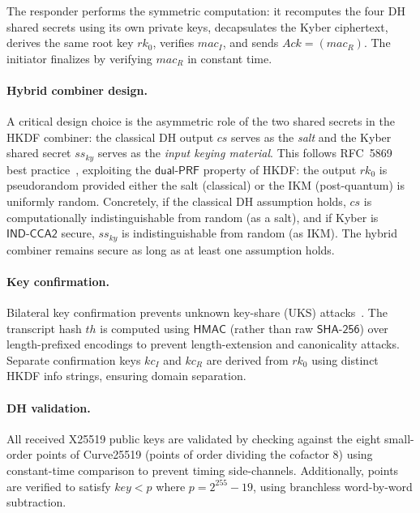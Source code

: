 \documentclass[11pt,a4paper]{article}
\theoremstyle{definition}
\newcommand{\HMAC}{\textsf{HMAC}}
\newcommand{\SHA}{\textsf{SHA-256}}
\newcommand{\INDCCA}{\textsf{IND-CCA2}}
\newcommand{\dualPRF}{\textsf{dual-PRF}}
\newcommand{\rk}{\mathit{rk}}
\begin{document}
The responder performs the symmetric computation: it recomputes the four DH shared secrets using its own private keys, decapsulates the Kyber ciphertext, derives the same root key $\rk_0$, verifies $\mathit{mac}_I$, and sends $\mathit{Ack} = (\mathit{mac}_R)$. The initiator finalizes by verifying $\mathit{mac}_R$ in constant time.

\paragraph{Hybrid combiner design.}
A critical design choice is the asymmetric role of the two shared secrets in the HKDF combiner: the classical DH output $\mathit{cs}$ serves as the \emph{salt} and the Kyber shared secret $\mathit{ss}_{\mathit{ky}}$ serves as the \emph{input keying material}. This follows RFC~5869 best practice~\cite{rfc5869}, exploiting the $\dualPRF$ property of HKDF: the output $\rk_0$ is pseudorandom provided either the salt (classical) or the IKM (post-quantum) is uniformly random. Concretely, if the classical DH assumption holds, $\mathit{cs}$ is computationally indistinguishable from random (as a salt), and if Kyber is $\INDCCA$ secure, $\mathit{ss}_{\mathit{ky}}$ is indistinguishable from random (as IKM). The hybrid combiner remains secure as long as at least one assumption holds.

\paragraph{Key confirmation.}
Bilateral key confirmation prevents unknown key-share (UKS) attacks~\cite{lamacchia2007}. The transcript hash $\mathit{th}$ is computed using $\HMAC$ (rather than raw $\SHA$) over length-prefixed encodings to prevent length-extension and canonicality attacks. Separate confirmation keys $\mathit{kc}_I$ and $\mathit{kc}_R$ are derived from $\rk_0$ using distinct HKDF info strings, ensuring domain separation.

\paragraph{DH validation.}
All received X25519 public keys are validated by checking against the eight small-order points of Curve25519 (points of order dividing the cofactor 8) using constant-time comparison to prevent timing side-channels. Additionally, points are verified to satisfy $\mathit{key} < p$ where $p = 2^{255} - 19$, using branchless word-by-word subtraction.
\end{document}
